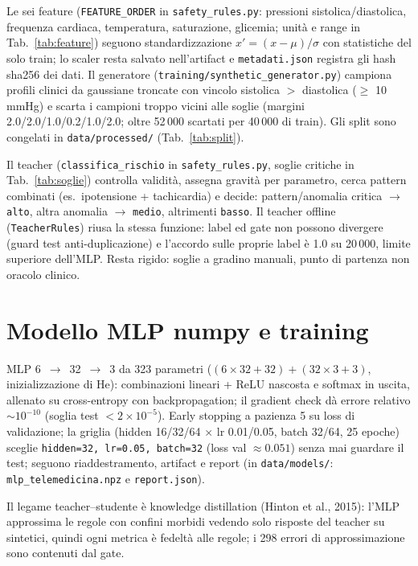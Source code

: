 \documentclass[11pt,a4paper]{article}
\newcommand{\codice}[1]{\texttt{#1}}
\newcommand{\file}[1]{\texttt{#1}}
\begin{document}
Le sei feature (\codice{FEATURE\_ORDER} in \file{safety\_rules.py}:
pressioni sistolica/diastolica, frequenza cardiaca, temperatura, saturazione,
glicemia; unità e range in Tab.~\ref{tab:feature}) seguono standardizzazione
$x'=(x-\mu)/\sigma$ con statistiche del solo train; lo scaler resta salvato
nell'artifact e \file{metadati.json} registra gli hash sha256 dei dati. Il
generatore (\file{training/synthetic\_generator.py}) campiona profili clinici
da gaussiane troncate con vincolo sistolica $>$ diastolica ($\ge$ 10 mmHg) e
scarta i campioni troppo vicini alle soglie (margini 2.0/2.0/1.0/0.2/1.0/2.0;
oltre 52\,000 scartati per 40\,000 di train). Gli split sono congelati in
\file{data/processed/} (Tab.~\ref{tab:split}).

Il teacher (\codice{classifica\_rischio} in \file{safety\_rules.py}, soglie
critiche in Tab.~\ref{tab:soglie}) controlla validità, assegna gravità per parametro, cerca pattern
combinati (es.\ ipotensione + tachicardia) e decide: pattern/anomalia critica $\to$ \codice{alto}, altra anomalia $\to$
\codice{medio}, altrimenti \codice{basso}. Il teacher offline
(\codice{TeacherRules}) riusa la stessa funzione: label ed gate non possono
divergere (guard test anti-duplicazione) e l'accordo sulle proprie label è
1.0 su 20\,000, limite superiore dell'MLP. Resta rigido: soglie a gradino
manuali, punto di partenza non oracolo clinico.

\section{Modello MLP numpy e training}\label{sec:modello}

MLP 6~$\to$~32~$\to$~3 da 323 parametri ($(6{\times}32{+}32)+(32{\times}3{+}3)$,
inizializzazione di He): combinazioni lineari + ReLU nascosta e softmax in
uscita, allenato su cross-entropy con backpropagation; il
gradient check dà errore relativo $\sim$$10^{-10}$ (soglia test
$<2{\times}10^{-5}$). Early stopping a pazienza 5 su loss di validazione; la
griglia (hidden 16/32/64 $\times$ lr 0.01/0.05, batch 32/64, 25 epoche) sceglie
\codice{hidden=32, lr=0.05, batch=32} (loss val $\approx 0.051$) senza mai
guardare il test; seguono riaddestramento, artifact e report (in
\file{data/models/}: \file{mlp\_telemedicina.npz} e \file{report.json}).

Il legame teacher--studente è knowledge distillation (Hinton et al., 2015):
l'MLP approssima le regole con confini morbidi vedendo solo risposte del
teacher su sintetici, quindi ogni metrica è fedeltà alle regole; i 298 errori
di approssimazione sono contenuti dal gate.
\end{document}
